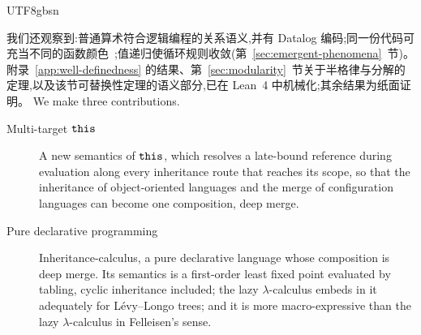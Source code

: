 \begin{CJK*}{UTF8}{gbsn}
\begin{description}
\end{description}
我们还观察到:普通算术符合逻辑编程的关系语义,并有 Datalog 编码;同一份代码可充当不同的函数颜色~\cite{nystrom2015-function-color};值递归使循环规则收敛(第~\ref{sec:emergent-phenomena}~节)。
附录~\ref{app:well-definedness} 的结果、第~\ref{sec:modularity}~节关于半格律与分解的定理,以及该节可替换性定理的语义部分,已在 Lean~4 中机械化;其余结果为纸面证明。
\else
We make three contributions.
\begin{description}
  \item[Multi-target $\mathtt{this}$] A new semantics of $\mathtt{this}$, which
    resolves a late-bound reference during evaluation along every inheritance route that reaches its
    scope, so that the inheritance of object-oriented languages and the merge of configuration languages
    can become one composition, deep merge.
  \item[Pure declarative programming] Inheritance-calculus, a pure declarative language whose
    composition is deep merge. Its semantics is a first-order least fixed point evaluated by tabling,
    cyclic inheritance included; the lazy $\lambda$-calculus embeds in it adequately for L\'evy--Longo
    trees; and it is more macro-expressive than the lazy $\lambda$-calculus in Felleisen's sense.

\end{description}
\end{CJK*}
